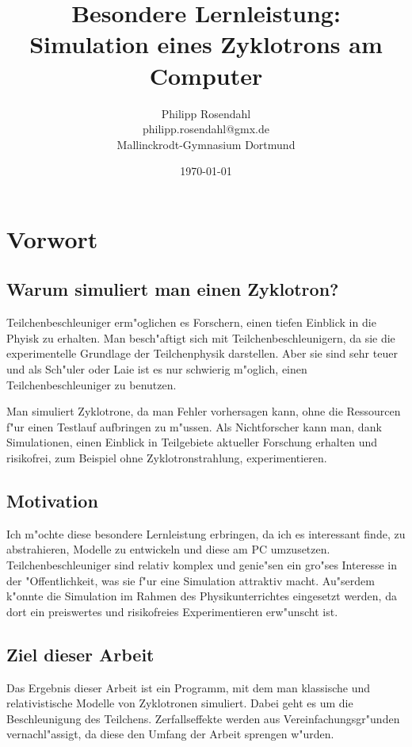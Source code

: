 \documentclass[14pt, a4paper]{report}
\begin{document}

\title{\bfseries \Large Besondere Lernleistung: \\ \Huge \color{titleblue}Simulation eines Zyklotrons am Computer}
\author{Philipp Rosendahl \\ philipp.rosendahl@gmx.de \\ Mallinckrodt-Gymnasium Dortmund}
\date{\today}

\maketitle

\tableofcontents

\chapter{Vorwort}
\section{Warum simuliert man einen Zyklotron?}
Teilchenbeschleuniger erm"oglichen es Forschern, einen tiefen Einblick in die
Phyisk zu erhalten. Man besch"aftigt sich mit Teilchenbeschleunigern, da sie die
experimentelle Grundlage der Teilchenphysik darstellen. Aber sie sind sehr
teuer und als Sch"uler oder Laie ist es nur schwierig m"oglich, einen
Teilchenbeschleuniger zu benutzen.

Man simuliert Zyklotrone, da man Fehler vorhersagen kann, ohne die Ressourcen
f"ur einen Testlauf aufbringen zu m"ussen. Als Nichtforscher kann man, dank 
Simulationen, einen Einblick in Teilgebiete aktueller Forschung erhalten und risikofrei,
zum Beispiel ohne Zyklotronstrahlung, experimentieren.

\section{Motivation}
Ich m"ochte diese besondere Lernleistung erbringen, da ich es interessant finde, 
zu abstrahieren, Modelle zu entwickeln und diese am PC umzusetzen. 
Teilchenbeschleuniger sind relativ komplex und genie"sen ein gro"ses Interesse
in der "Offentlichkeit, was sie f"ur eine Simulation attraktiv macht. Au"serdem
k"onnte die Simulation im Rahmen des Physikunterrichtes eingesetzt werden, da dort 
ein preiswertes und risikofreies Experimentieren erw"unscht ist.
\section{Ziel dieser Arbeit}
Das Ergebnis dieser Arbeit ist ein Programm, mit dem man klassische und 
relativistische Modelle von Zyklotronen simuliert.
Dabei geht es um die Beschleunigung des Teilchens.
Zerfallseffekte werden aus Vereinfachungsgr"unden vernachl"assigt, da diese den
Umfang der Arbeit sprengen w"urden.
\end{document}
